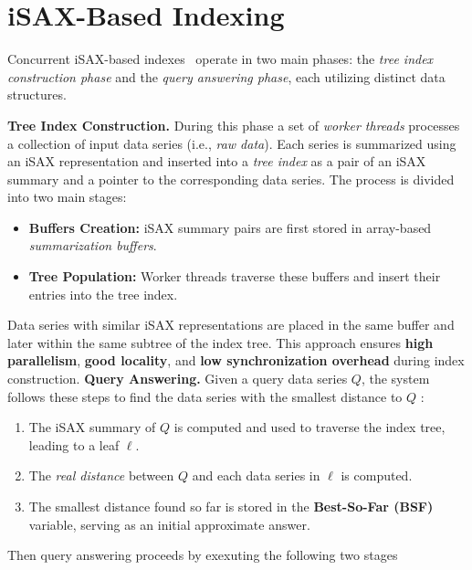 \section{iSAX-Based Indexing}

Concurrent iSAX-based indexes~\cite{peng2018paris,parisplus,peng2020messi,  
PFP21-I,PFP21-II} operate in two main phases:  
the \textit{tree index construction phase} and the \textit{query answering phase},  
each utilizing distinct data structures. 

\noindent\textbf{Tree Index Construction.} During this phase a set of \textit{worker threads}  
processes a collection of input data series (i.e., \textit{raw data}).  
Each series is summarized using an iSAX representation and inserted into a 
\textit{tree index} as a pair of an iSAX summary and a pointer to the corresponding 
data series.  
% 
The process is divided into two main stages:
\begin{itemize} [noitemsep, topsep=3pt, partopsep=0pt, parsep=0pt]
    \item \textbf{Buffers Creation:} iSAX summary pairs are first stored in array-based  
    \textit{summarization buffers}.  
    \item \textbf{Tree Population:} Worker threads traverse these buffers and insert 
    their entries into the tree index.  
\end{itemize}  
Data series with similar iSAX representations are placed in the same buffer and later  
within the same subtree of the index tree.  
This approach ensures \textbf{high parallelism}, \textbf{good locality}, and  
\textbf{low synchronization overhead} during index construction.
\newline\noindent\textbf{Query Answering.}  
Given a query data series \( Q \), the system follows these steps
to find the data series with the smallest distance to \( Q \) :  
\begin{enumerate}[noitemsep, topsep=1pt, partopsep=0pt, parsep=0pt]
    \item The iSAX summary of \( Q \) is computed and used to traverse the index tree,  
    leading to a leaf \( \ell \).  
    \item The \textit{real distance} between \( Q \) and each data series in \( \ell \) is computed.  
    \item The smallest distance found so far is stored in the \textbf{Best-So-Far (BSF)} variable,  
    serving as an initial approximate answer.  
\end{enumerate}  
% 
Then query answering proceeds by exexuting the following two stages
